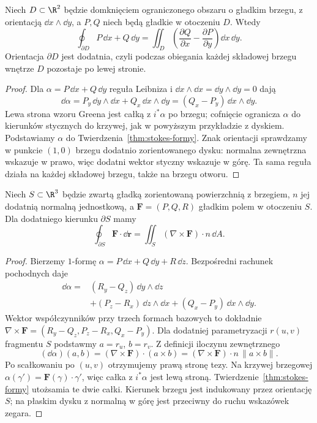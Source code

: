 \begin{wniosek}
\label{cor:stokes-green}
Niech $D\subset\R^2$ będzie domknięciem ograniczonego
obszaru o gładkim brzegu, z orientacją $\dd x\wedge\dd y$,
a $P,Q$ niech będą gładkie w otoczeniu $D$. Wtedy
\[
 \oint_{\partial D}P\,\dd x+Q\,\dd y
 =\iint_D\left(\frac{\partial Q}{\partial x}
             -\frac{\partial P}{\partial y}\right)
       \dd x\,\dd y.
\]
Orientacja $\partial D$ jest dodatnia, czyli
podczas obiegania każdej składowej brzegu
wnętrze $D$ pozostaje po lewej stronie.
\end{wniosek}
\begin{proof}
Dla $\alpha=P\,\dd x+Q\,\dd y$ reguła
Leibniza i $\dd x\wedge\dd x
=\dd y\wedge\dd y=0$ dają
\[
 \dd\alpha
 =P_y\,\dd y\wedge\dd x
  +Q_x\,\dd x\wedge\dd y
 =(Q_x-P_y)\,\dd x\wedge\dd y.
\]
Lewa strona wzoru Greena jest całką z
$i^*\alpha$ po brzegu; cofnięcie ogranicza
$\alpha$ do kierunków stycznych do krzywej,
jak w powyższym przykładzie z dyskiem. Podstawiamy $\alpha$ do
Twierdzenia~\ref{thm:stokes-formy}.
Znak orientacji sprawdzamy w punkcie
$(1,0)$ brzegu dodatnio zorientowanego dysku:
normalna zewnętrzna wskazuje w prawo, więc
dodatni wektor styczny wskazuje w górę.
Ta sama reguła działa na każdej składowej
brzegu, także na brzegu otworu.
\end{proof}

\begin{wniosek}
\label{cor:stokes-curl}
Niech $S\subset\R^3$ będzie zwartą gładką
zorientowaną powierzchnią z brzegiem,
$n$ jej dodatnią normalną jednostkową,
a $\mathbf F=(P,Q,R)$ gładkim polem w otoczeniu $S$.
Dla dodatniego kierunku $\partial S$ mamy
\[
 \oint_{\partial S}\mathbf F\cdot\dd\mathbf r
 =\iint_S(\nabla\times\mathbf F)\cdot n\,\dd A.
\]
\end{wniosek}
\begin{proof}
Bierzemy $1$-formę
$\alpha=P\,\dd x+Q\,\dd y+R\,\dd z$.
Bezpośredni rachunek pochodnych daje
\[
 \begin{aligned}
 \dd\alpha={}&(R_y-Q_z)\,\dd y\wedge\dd z\\
 &+(P_z-R_x)\,\dd z\wedge\dd x
 +(Q_x-P_y)\,\dd x\wedge\dd y.
 \end{aligned}
\]
Wektor współczynników przy trzech formach
bazowych to dokładnie
$\nabla\times\mathbf F
=(R_y-Q_z,P_z-R_x,Q_x-P_y)$.
Dla dodatniej parametryzacji
$r(u,v)$ fragmentu $S$ podstawmy
$a=r_u$, $b=r_v$. Z definicji iloczynu
zewnętrznego
\[
 (\dd\alpha)(a,b)
 =(\nabla\times\mathbf F)\cdot(a\times b)
 =(\nabla\times\mathbf F)\cdot n\,
    \lVert a\times b\rVert.
\]
Po scałkowaniu po $(u,v)$ otrzymujemy prawą
stronę tezy. Na krzywej brzegowej
$\alpha(\gamma')=\mathbf F(\gamma)\cdot\gamma'$,
więc całka z $i^*\alpha$ jest lewą stroną.
Twierdzenie~\ref{thm:stokes-formy} utożsamia
te dwie całki. Kierunek brzegu jest
indukowany przez orientację $S$; na płaskim
dysku z normalną w górę jest przeciwny
do ruchu wskazówek zegara.
\end{proof}

